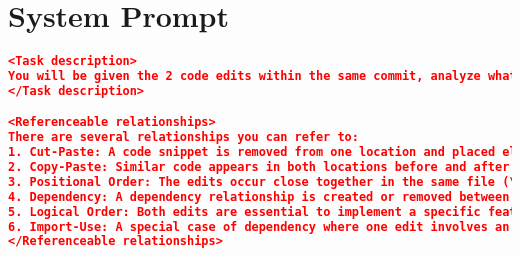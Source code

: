 \chapter{System Prompt}

\lstset{
    basicstyle=\scriptsize\ttfamily, %
    breaklines=true,            %
    frame=single                %
}

\begin{lstlisting}[language=json, basicstyle=\fontsize{8}{10}\selectfont\ttfamily]   
<Task description>
You will be given the 2 code edits within the same commit, analyze what is deleted and added in the 2 edits, and their relationship before and after the edit. Recover the edit scenario and predict their editing order based on the causal relationships. Not all edit pairs have causal relationships.
</Task description>

<Referenceable relationships>
There are several relationships you can refer to:
1. Cut-Paste: A code snippet is removed from one location and placed elsewhere. The cut action typically precedes the paste action.
2. Copy-Paste: Similar code appears in both locations before and after the edits, indicating duplication. This relationship is generally bidirectional.
3. Positional Order: The edits occur close together in the same file (\leq 10 lines apart) and share a similar context, block, or scope.
4. Dependency: A dependency relationship is created or removed between the edits. Ignore this relationship if it already existed in both the pre-edit and post-edit states.
5. Logical Order: Both edits are essential to implement a specific feature and are interdependent.
6. Import-Use: A special case of dependency where one edit involves an import statement, and the other involves the use of the imported symbol. The edit with reference to the method or variable introduced in the import should be the source edit, and the import edit should be the target. 
</Referenceable relationships>


\end{lstlisting}
